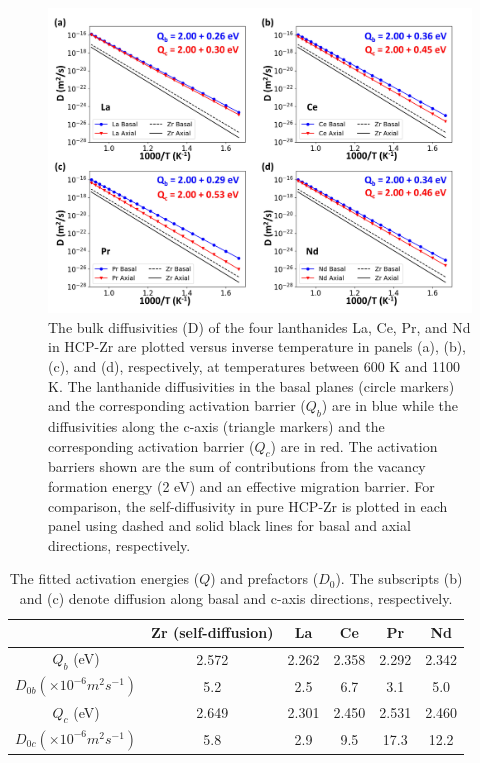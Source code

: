 \documentclass[preprint,12pt]{elsarticle}
\begin{document}
\begin{figure}[h!]
    \centering
    \includegraphics[width=\textwidth]{diffusivities_Q_updated.jpg}
    \caption{The bulk diffusivities (D) of the four lanthanides La, Ce, Pr, and Nd in HCP-Zr are plotted versus inverse temperature in panels (a), (b), (c), and (d), respectively, at temperatures between 600 K and 1100 K. The lanthanide diffusivities in the basal planes (circle markers) and the corresponding activation barrier ($Q_b$) are in blue while the diffusivities along the c-axis (triangle markers) and the corresponding activation barrier ($Q_c$) are in red. The activation barriers shown are the sum of contributions from the vacancy formation energy (2 eV) and an effective migration barrier. %
    For comparison, the self-diffusivity in pure HCP-Zr is plotted in each panel using dashed and solid black lines for basal and axial directions, respectively.}
    \label{fig:diffusivities_ln}
\end{figure}

\begin{table}[h!]
    \centering
    \caption{The fitted activation energies ($Q$) and prefactors ($D_0$). The subscripts (b) and (c) denote diffusion along basal and c-axis directions, respectively.}
    \label{tab:arrhenius_fit}
    \begin{tabular}{c|c|c|c|c|c}
    \toprule
       & Zr (self-diffusion) & La & Ce & Pr & Nd  \\
       \hline
      $Q_b$ (eV) & 2.572 &2.262 &2.358 & 2.292  & 2.342 \\
      $D_{0b} (\times10^{-6} m^2s^{-1})$ & 5.2 & 2.5 & 6.7 & 3.1  &5.0 \\
      \hline
      $Q_c$ (eV) & 2.649 &2.301 &2.450 &2.531   &2.460 \\
      $D_{0c}  (\times10^{-6} m^2s^{-1})$  &5.8 &2.9 &9.5 & 17.3  &12.2 \\
      \bottomrule
    \end{tabular}
\end{table}
\end{document}
